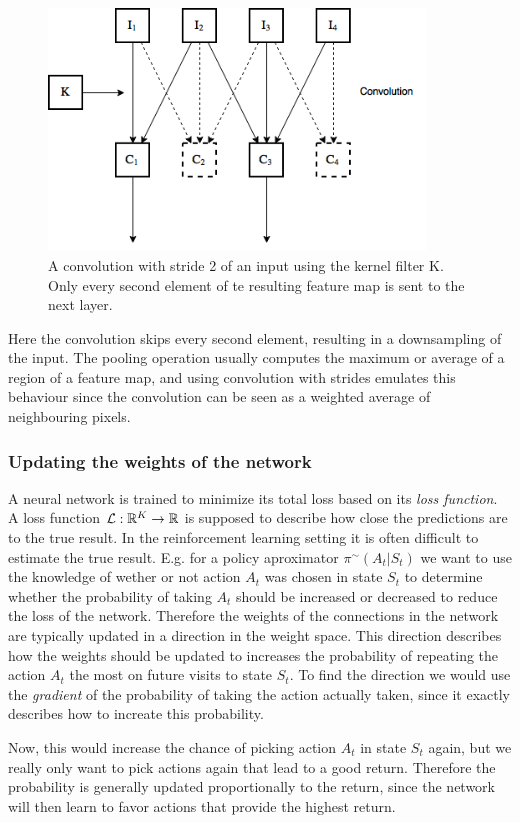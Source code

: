 \documentclass[11pt]{article}
\begin{document}
\begin{figure}[!h]\label{con2}
    \centering
    \includegraphics[width=10cm]{include/strides.png}
    \caption{A convolution with stride 2 of an input using the kernel filter K. Only every second
        element of te resulting
            feature map is sent to the next layer.}
    \label{fig:conv}
\end{figure}

Here the convolution skips every second element, resulting in a downsampling
of the input.
The pooling operation usually computes the maximum or average of a region of a feature map,
and using convolution with strides emulates this behaviour since the convolution
can be seen as a weighted average of neighbouring pixels.


\subsubsection{Updating the weights of the network}

A neural network is trained to minimize its total loss based on its \textit{loss
function}.
A loss function $\mathcal{L} : \mathbb{R}^K \to \mathbb{R}$ is supposed to describe how close the
predictions are to the true result.
In the reinforcement learning setting it is often difficult to estimate the
true result.
E.g. for a policy aproximator $\pi^{\sim}(A_t | S_t)$ we want to use the knowledge
of wether or not action $A_t$ was  chosen in state $S_t$ to determine
whether the probability of taking $A_t$ should be increased or decreased to
reduce the loss of the network.
Therefore the weights of the connections in the network are typically updated
in a direction in the weight space.
This direction describes how the weights should be updated to increases the
probability of repeating the action $A_t$ the most on future visits to
state $S_t$\cite{RLbook}.
To find the direction we would use the \textit{gradient} of the probability of
taking the action actually taken, since it exactly describes how to increate
this probability.

Now, this would increase the chance of picking action $A_t$ in state $S_t$ again,
but we really only want to pick actions again that lead to a good return.
Therefore the probability is generally updated proportionally to the
return, since the network will then learn to favor actions that provide
the highest return.
\end{document}
